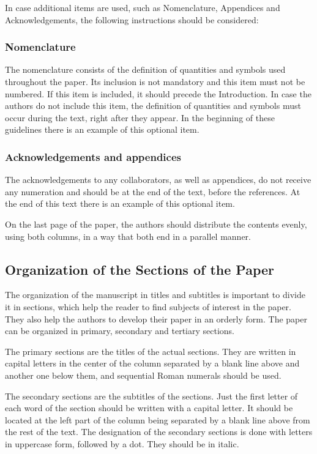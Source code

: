 \documentclass[english]{sobraep}
\begin{document}
In case additional items are used, such as Nomenclature, Appendices and Acknowledgements, the following instructions should be considered:

\subsubsection{Nomenclature}

The nomenclature consists of the definition of quantities and symbols used throughout the paper. Its inclusion is not mandatory and this item must not be numbered. If this item is included, it should precede the Introduction. In case the authors do not include this item, the  definition of quantities and symbols must occur during the text, right after they appear. In the beginning of these guidelines there is an example of this optional item.

\subsubsection{Acknowledgements and appendices}

The acknowledgements to any collaborators, as well as appendices, do not receive any numeration and should be at the end of the text, before the references. At the end of this text there is an example of this optional item.

On the last page of the paper, the authors should distribute the contents evenly, using both columns, in a way that both end in a parallel manner.

\subsection{Organization of the Sections of the Paper}

The organization of the manuscript in titles and subtitles is important to divide it in sections, which help the reader to find subjects of interest in the paper. They also help the authors to develop their paper in an orderly form. The paper can be organized in primary, secondary and tertiary sections.

The primary sections are the titles of the actual sections. They are written in capital letters in the center of the column separated by a blank line above and another one below them, and sequential Roman numerals should be used.

The secondary sections are the subtitles of the sections. Just the first letter of each word of the section should be written with a capital letter. It should be located at the left part of the column being separated by a blank line above from the rest of the text. The designation of the secondary sections is done with letters in uppercase form, followed by a dot. They should be in italic.
\end{document}

